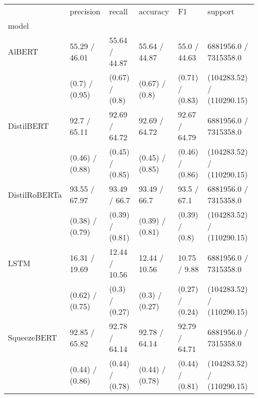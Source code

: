 \begin{tabular}{llllll}
\toprule
{} &        precision &           recall &         accuracy &               F1 &                    support \\
model                  &                  &                  &                  &                  &                            \\
\midrule
AlBERT                 &    55.29 / 46.01 &    55.64 / 44.87 &    55.64 / 44.87 &     55.0 / 44.63 &      6881956.0 / 7315358.0 \\
                 &   (0.7) / (0.95) &   (0.67) / (0.8) &   (0.67) / (0.8) &  (0.71) / (0.83) &  (104283.52) / (110290.15) \\
DistilBERT             &     92.7 / 65.11 &    92.69 / 64.72 &    92.69 / 64.72 &    92.67 / 64.79 &      6881956.0 / 7315358.0 \\
             &  (0.46) / (0.88) &  (0.45) / (0.85) &  (0.45) / (0.85) &  (0.46) / (0.86) &  (104283.52) / (110290.15) \\
DistilRoBERTa          &    93.55 / 67.97 &     93.49 / 66.7 &     93.49 / 66.7 &      93.5 / 67.1 &      6881956.0 / 7315358.0 \\
          &  (0.38) / (0.79) &  (0.39) / (0.81) &  (0.39) / (0.81) &   (0.39) / (0.8) &  (104283.52) / (110290.15) \\
LSTM                   &    16.31 / 19.69 &    12.44 / 10.56 &    12.44 / 10.56 &     10.75 / 9.88 &      6881956.0 / 7315358.0 \\
                   &  (0.62) / (0.75) &   (0.3) / (0.27) &   (0.3) / (0.27) &  (0.27) / (0.24) &  (104283.52) / (110290.15) \\
SqueezeBERT &    92.85 / 65.82 &    92.78 / 64.14 &    92.78 / 64.14 &    92.79 / 64.71 &      6881956.0 / 7315358.0 \\
 &  (0.44) / (0.86) &  (0.44) / (0.78) &  (0.44) / (0.78) &  (0.44) / (0.81) &  (104283.52) / (110290.15) \\
\bottomrule
\end{tabular}
